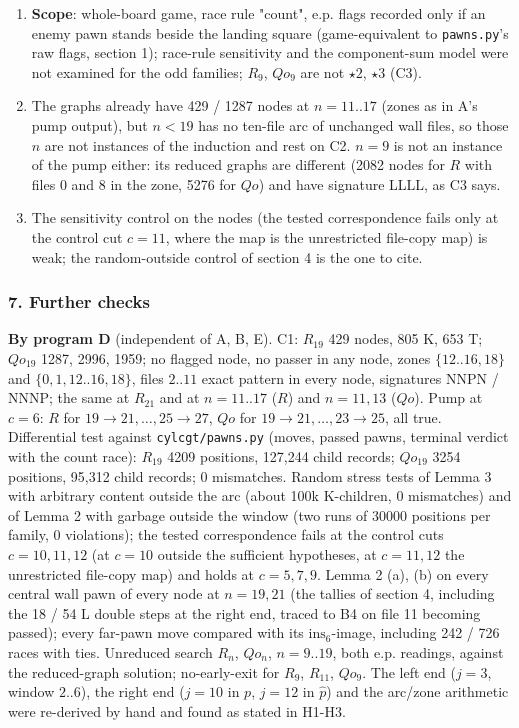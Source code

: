 \begin{enumerate}
\item \textbf{Scope}: whole-board game, race rule "count", e.p. flags recorded only if an enemy pawn stands beside the landing square (game-equivalent to \texttt{pawns.py}'s raw flags, section 1); race-rule sensitivity and the component-sum model were not examined for the odd families; $R_9$, $Qo_9$ are not $\star2$, $\star3$ (C3).
\item The graphs already have 429 / 1287 nodes at $n=11..17$ (zones as in A's pump output), but $n<19$ has no ten-file arc of unchanged wall files, so those $n$ are not instances of the induction and rest on C2. $n=9$ is not an instance of the pump either: its reduced graphs are different (2082 nodes for $R$ with files $0$ and $8$ in the zone, 5276 for $Qo$) and have signature LLLL, as C3 says.
\item The sensitivity control on the nodes (the tested correspondence fails only at the control cut $c=11$, where the map is the unrestricted file-copy map) is weak; the random-outside control of section 4 is the one to cite.
\end{enumerate}
\subsubsection*{7. Further checks}
\textbf{By program D} (independent of A, B, E). C1: $R_{19}$ 429 nodes, 805 K, 653 T; $Qo_{19}$ 1287, 2996, 1959; no flagged node, no passer in any node, zones $\{12..16,18\}$ and $\{0,1,12..16,18\}$, files $2..11$ exact pattern in every node, signatures NNPN / NNNP; the same at $R_{21}$ and at $n=11..17$ ($R$) and $n=11,13$ ($Qo$). Pump at $c=6$: $R$ for $19\to21,\dots,25\to27$, $Qo$ for $19\to21,\dots,23\to25$, all true. Differential test against \texttt{cylcgt/pawns.py} (moves, passed pawns, terminal verdict with the count race): $R_{19}$ 4209 positions, 127,244 child records; $Qo_{19}$ 3254 positions, 95,312 child records; 0 mismatches. Random stress tests of Lemma 3 with arbitrary content outside the arc (about 100k K-children, 0 mismatches) and of Lemma 2 with garbage outside the window (two runs of 30000 positions per family, 0 violations); the tested correspondence fails at the control cuts $c=10,11,12$ (at $c=10$ outside the sufficient hypotheses, at $c=11,12$ the unrestricted file-copy map) and holds at $c=5,7,9$. Lemma 2 (a), (b) on every central wall pawn of every node at $n=19,21$ (the tallies of section 4, including the 18 / 54 L double steps at the right end, traced to B4 on file 11 becoming passed); every far-pawn move compared with its $\mathrm{ins}_6$-image, including 242 / 726 races with ties. Unreduced search $R_n$, $Qo_n$, $n=9..19$, both e.p. readings, against the reduced-graph solution; no-early-exit for $R_9$, $R_{11}$, $Qo_9$. The left end ($j=3$, window $2..6$), the right end ($j=10$ in $p$, $j=12$ in $\hat p$) and the arc/zone arithmetic were re-derived by hand and found as stated in H1-H3.

